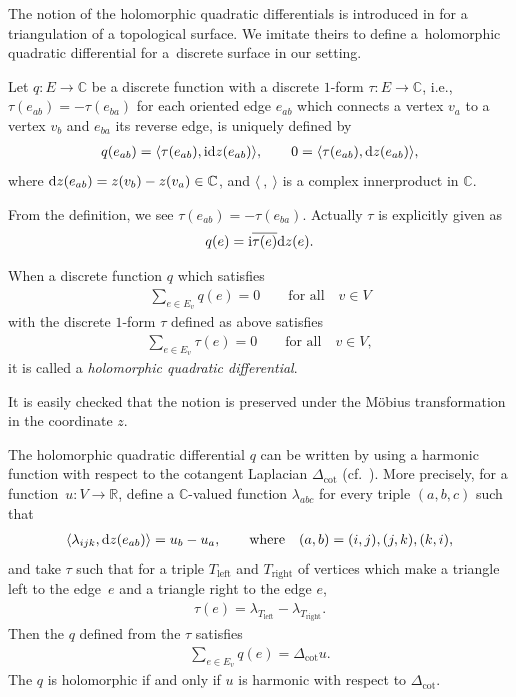 \documentclass[10pt,a4paper]{amsart}
\newcommand{\R}{\mathbb{R}}
\newcommand{\C}{\mathbb{C}}
\newcommand{\ii}{{\mathrm{i}}}
\newcommand{\1}{{\bf 1}}
\newcommand{\nai}{\langle}
\newcommand{\seki}{\rangle}
\numberwithin{equation}{section}
\begin{document}
The notion of the holomorphic quadratic differentials is introduced in \cite{lam-pinkall} for a triangulation of a topological surface.
We imitate theirs to define a~holomorphic quadratic differential for a~discrete surface in our setting.

Let $q\colon E\to \C$ be a discrete function with a discrete $1$-form $\tau \colon E \to \C$,
i.e., $\tau(e_{ab}) = - \tau(e_{ba})$ for each oriented edge $e_{ab}$
which connects a vertex $v_a$ to a vertex $v_b$ and $e_{ba}$ its reverse edge, is uniquely defined by
\begin{gather*}
 q(e_{ab}) = \nai \tau(e_{ab}), \ii {\rm d}z(e_{ab}) \seki, \qquad
 0 = \nai \tau(e_{ab}), {\rm d}z(e_{ab}) \seki,
\end{gather*}
where ${\rm d}z(e_{ab}) = z(v_b)- z(v_a) \in \C$, and $\nai ~,~\seki$ is a complex innerproduct in $\C$.

From the definition, we see $\tau(e_{ab})= -\tau(e_{ba})$.
Actually $\tau$ is explicitly given as
\begin{gather*}
 q(e) = \ii \overline{\tau(e)}{\rm d}z(e).
\end{gather*}

\begin{Definition}
 When a discrete function $q$ which satisfies
 \begin{gather*}
 \sum_{e \in E_v} q(e)=0 \qquad \text{for all}\quad v \in V
 \end{gather*}
 with the discrete $1$-form $\tau$ defined as above satisfies
 \begin{gather*}
 \sum_{e \in E_v} \tau(e)=0 \qquad \text{for all}\quad v \in V,
 \end{gather*}
 it is called a {\em holomorphic quadratic differential}.
\end{Definition}
It is easily checked that the notion is preserved under the M\"obius transformation in the coordinate $z$.
\begin{Remark}
 The holomorphic quadratic differential $q$ can be written by using a harmonic function
 with respect to the cotangent Laplacian $\Delta_{\cot}$ (cf.\ \cite{pinkall-polthier}).
 More precisely, for a function~${u \colon V \to \R}$,
 define a $\C$-valued function $\lambda_{abc} $ for every triple $(a,b,c)$ such that
 \begin{gather*}
 \nai \lambda_{ijk}, {\rm d}z(e_{ab}) \seki = u_b -u_a, \qquad\text{where}\quad (a,b) = (i,j), (j,k),(k,i),
 \end{gather*}
 and take $\tau$ such that for a triple $T_{\mathrm{left}}$ and $T_{\mathrm{right}}$ of vertices
 which make a triangle left to the edge~$e$ and a triangle right to the edge $e$,
 \begin{gather*}
 \tau (e) = \lambda_{T_{\mathrm{left}}} -\lambda_{T_{\mathrm{right}}}.
 \end{gather*}
 Then the $q$ defined from the $\tau$ satisfies
 \begin{gather*}
 \sum_{e \in E_v} q(e) = \Delta_{\cot}u.
 \end{gather*}
 The $q$ is holomorphic if and only if $u$ is harmonic with respect to $\Delta_{\cot}$.
\end{Remark}
\end{document}
